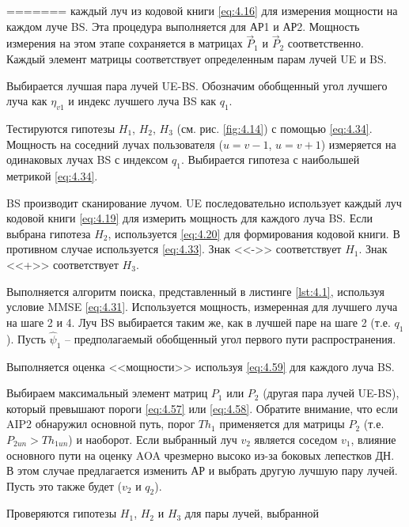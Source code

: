 =======
          каждый луч из кодовой книги \eqref{eq:4.16}
          для измерения мощности на каждом луче BS.  Эта процедура
          выполняется для АР1 и АР2. Мощность измерения на этом этапе
          сохраняется в матрицах $\vec P_1$ и $\vec P_2$ соответственно.
          Каждый элемент матрицы соответствует
          определенным парам лучей UE и BS.
    \item Выбирается лучшая пара лучей UE-BS. Обозначим обобщенный угол
          лучшего луча как $\eta_{v1}$ и индекс лучшего луча BS как
          $q_1$.
    \item Тестируются гипотезы $H_1$, $H_2$, $H_3$ (см. рис. \ref{fig:4.14}) с
          помощью \eqref{eq:4.34}. Мощность на соседний лучах пользователя
          ($u=v-1$, $u=v+1$) измеряется на одинаковых лучах BS с индексом
          $q_1$. Выбирается гипотеза с наибольшей метрикой \eqref{eq:4.34}.
    \item BS производит сканирование лучом.
          UE последовательно использует каждый луч кодовой книги \eqref{eq:4.19} для
          измерить мощность для каждого луча BS. Если выбрана гипотеза $H_2$,
          используется \eqref{eq:4.20} для формирования кодовой книги.
          В противном случае используется \eqref{eq:4.33}.
          Знак <<->> соответствует $H_1$. Знак <<+>> соответствует $H_3$.
    \item Выполняется алгоритм поиска, представленный в листинге \ref{lst:4.1}, используя
          условие MMSE \eqref{eq:4.31}.
          Используется мощность, измеренная для лучшего луча на
          шаге 2 и 4. Луч BS выбирается таким же, как в
          лучшей паре на шаге 2 (т.е. $q_1$). Пусть $\hat \psi_1$ --
          предполагаемый обобщенный угол первого пути распространения.
    \item Выполняется оценка <<мощности>> используя \eqref{eq:4.59} для
          каждого луча BS.
    \item Выбираем максимальный элемент матриц $P_1$ или $P_2$ (другая пара лучей
          UE-BS), который превышают пороги \eqref{eq:4.57} или \eqref{eq:4.58}.
          Обратите внимание, что если AIP2 обнаружил основной путь, порог
          $Th_1$ применяется для матрицы $P_2$ (т.е. $P_{2un} > Th_{1un}$) и наоборот.
          Если выбранный луч $v_2$ является соседом $v_1$, влияние основного
          пути на оценку AOA чрезмерно высоко из-за боковых лепестков ДН.
          В этом случае предлагается изменить АР и выбрать
          другую лучшую пару лучей.  Пусть это также будет ($v_2$ и $q_2$).
    \item Проверяются гипотезы $H_1$, $H_2$ и $H_3$ для пары лучей, выбранной
